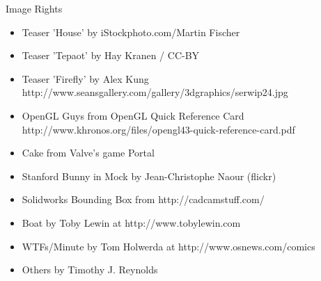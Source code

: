 \begin{frame}{Image Rights}
	
	\begin{itemize}
		\item Teaser 'House' by iStockphoto.com/Martin Fischer
		\item Teaser 'Tepaot' by Hay Kranen / CC-BY
		\item Teaser 'Firefly' by Alex Kung http://www.seansgallery.com/gallery/3dgraphics/serwip24.jpg
		\item OpenGL Guys from OpenGL Quick Reference Card http://www.khronos.org/files/opengl43-quick-reference-card.pdf
		\item Cake from Valve's game Portal
		\item Stanford Bunny in Mock by Jean-Christophe Naour (flickr)
		\item Solidworks Bounding Box from http://cadcamstuff.com/
		\item Boat by Toby Lewin at http://www.tobylewin.com
		\item WTFs/Minute by Tom Holwerda at http://www.osnews.com/comics
		\item Others by Timothy J. Reynolds
	\end{itemize}
	
\end{frame}



